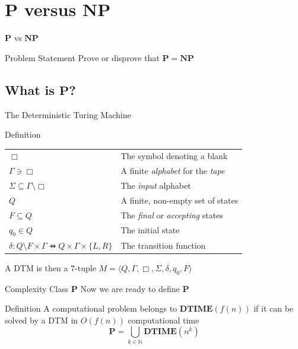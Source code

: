 \documentclass{beamer}
\newcommand{\Natural}{\mathbb{N}}
\newcommand{\PTIME}{\mathbf{P}}
\newcommand{\NPTIME}{\mathbf{NP}}
\newcommand{\DTIME}{\mathbf{DTIME}}
\begin{document}
  \section{$\PTIME$ versus $\NPTIME$}
  \begin{frame}{$\PTIME$ vs $\NPTIME$}
      \begin{block}{Problem Statement}
          Prove or disprove that $\PTIME = \NPTIME$
      \end{block}
  \end{frame}
  \subsection{What is $\PTIME$?}
  \begin{frame}{The Deterministic Turing Machine}
      \pause
      \begin{block}{Definition}
          \pause
          \begin{table}[]
              \centering
              \begin{tabular}{ll}
                  $\Box$ & The symbol denoting a blank \pause \\
                  $\Gamma \ni \Box$
                  & A finite \textit{alphabet} for the \textit{tape} \pause \\
                  $\Sigma \subseteq \Gamma \setminus \Box$ 
                  & The \textit{input} alphabet \pause \\
                  $Q$ & A finite, non-empty set of states \pause \\
                  $F \subseteq Q$
                  & The \textit{final} or \textit{accepting} states \pause \\
                  $q_0 \in Q$ & The initial state \pause \\
                  $\delta: Q \setminus F \times \Gamma \pfun Q
                  \times \Gamma \times \{L, R\}$ & The transition function
              \end{tabular}
          \end{table}
          \pause
          A DTM is then a 7-tuple
          $M = \langle Q, \Gamma, \Box, \Sigma, \delta, q_0, F \rangle$
      \end{block}
  \end{frame}
  \begin{frame}{Complexity Class $\PTIME$}
      Now we are ready to define $\PTIME$
      \pause
      \begin{block}{Definition}
          A computational problem belongs to
              $\DTIME\left(f(n)\right)$ if it can be solved by a
              DTM in $O(f(n))$ computational time 
              \pause
          $$\PTIME = \bigcup_{k \in \Natural}
              \DTIME\left(n^k\right)$$
      \end{block}
  \end{frame}
\end{document}
